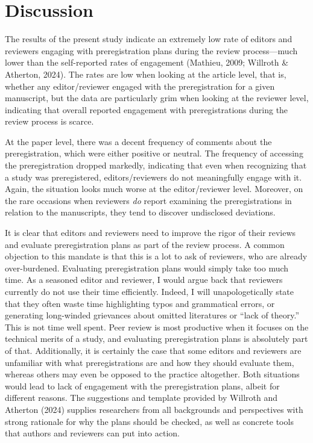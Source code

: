 \documentclass[authordate, empirical]{jote-new-article}
\begin{document}
	\section{\textbf{Discussion}}



	The results of the present study indicate an extremely low rate of editors and reviewers engaging with preregistration plans during the review process—much lower than the self-reported rates of engagement (Mathieu, 2009; Willroth \& Atherton, 2024). The rates are low when looking at the article level, that is, whether any editor/reviewer engaged with the preregistration for a given manuscript, but the data are particularly grim when looking at the reviewer level, indicating that overall reported engagement with preregistrations during the review process is scarce.



	At the paper level, there was a decent frequency of comments about the preregistration, which were either positive or neutral. The frequency of accessing the preregistration dropped markedly, indicating that even when recognizing that a study was preregistered, editors/reviewers do not meaningfully engage with it. Again, the situation looks much worse at the editor/reviewer level. Moreover, on the rare occasions when reviewers \emph{do} report examining the preregistrations in relation to the manuscripts, they tend to discover undisclosed deviations.



	It is clear that editors and reviewers need to improve the rigor of their reviews and evaluate preregistration plans as part of the review process. A common objection to this mandate is that this is a lot to ask of reviewers, who are already over-burdened. Evaluating preregistration plans would simply take too much time. As a seasoned editor and reviewer, I would argue back that reviewers currently do not use their time efficiently. Indeed, I will unapologetically state that they often waste time highlighting typos and grammatical errors, or generating long-winded grievances about omitted literatures or “lack of theory.” This is not time well spent. Peer review is most productive when it focuses on the technical merits of a study, and evaluating preregistration plans is absolutely part of that. Additionally, it is certainly the case that some editors and reviewers are unfamiliar with what preregistrations are and how they should evaluate them, whereas others may even be opposed to the practice altogether. Both situations would lead to lack of engagement with the preregistration plans, albeit for different reasons. The suggestions and template provided by Willroth and Atherton (2024) supplies researchers from all backgrounds and perspectives with strong rationale for why the plans should be checked, as well as concrete tools that authors and reviewers can put into action.
\end{document}
